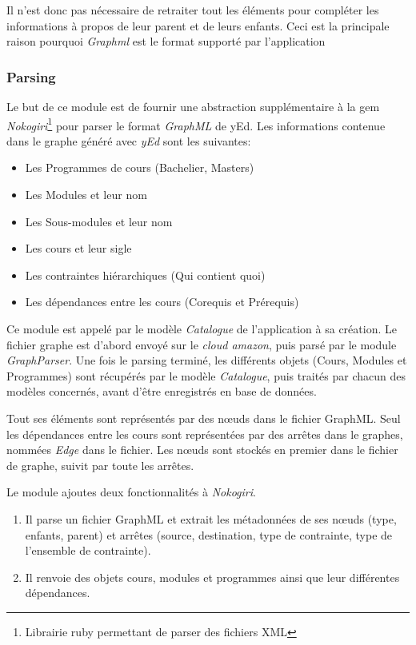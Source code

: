 Il n'est donc pas nécessaire de retraiter tout les éléments pour compléter les informations à propos de leur parent et de leurs enfants. Ceci est la principale raison pourquoi \textit{Graphml} est le format supporté par l'application


\subsubsection{Parsing}
Le but de ce module est de fournir une abstraction supplémentaire à la gem \textit{Nokogiri}\footnote{Librairie ruby permettant de parser des fichiers XML} pour parser le format \textit{GraphML} de yEd. Les informations contenue dans le graphe généré avec \textit{yEd} sont les suivantes:
\begin{itemize}
\item Les Programmes de cours (Bachelier, Masters)
\item Les Modules et leur nom
\item Les Sous-modules et leur nom
\item Les cours et leur sigle
\item Les contraintes hiérarchiques (Qui contient quoi)
\item Les dépendances entre les cours (Corequis et Prérequis)
\end{itemize}

Ce module est appelé par le modèle \textit{Catalogue} de l'application à sa création. Le fichier graphe est d'abord envoyé sur le  \textit{cloud amazon}, puis parsé par le module \textit{GraphParser}. Une fois le parsing terminé, les différents objets (Cours, Modules et Programmes) sont récupérés par le modèle \textit{Catalogue}, puis traités par chacun des modèles concernés, avant d'être enregistrés en base de données. 

Tout ses éléments sont représentés par des nœuds dans le fichier GraphML. Seul les dépendances entre les cours sont représentées par des arrêtes dans le graphes, nommées \textit{Edge} dans le fichier. Les nœuds sont stockés en premier dans le fichier de graphe, suivit par toute les arrêtes. 

Le module ajoutes deux fonctionnalités à \textit{Nokogiri}.
\begin{enumerate}
  \item Il parse un fichier GraphML et extrait les métadonnées de ses nœuds (type, enfants, parent) et arrêtes (source, destination, type de contrainte, type de l'ensemble de contrainte). 
  \item Il renvoie des objets cours, modules et programmes ainsi que leur différentes dépendances.  
\end{enumerate}

